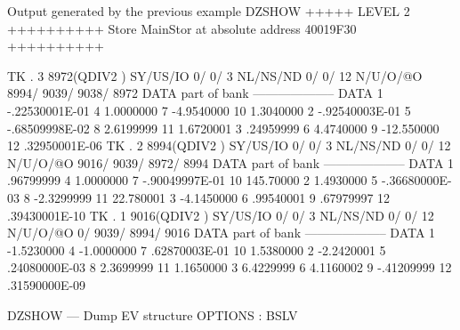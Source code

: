 \begin{Listing}{Output generated by the previous example}
DZSHOW  +++++ LEVEL     2 ++++++++++            Store  MainStor at absolute address 40019F30      ++++++++++                     
                                                                                                                                 
 TK  .     3     8972(QDIV2   ) SY/US/IO    0/    0/   3 NL/NS/ND    0/    0/      12 N/U/O/@O    8994/    9039/    9038/    8972
DATA part of bank                                         --------------------                                                   
DATA      1    -.22530001E-01     4     1.0000000         7    -4.9540000        10     1.3040000                                
          2    -.92540003E-01     5    -.68509998E-02     8     2.6199999        11     1.6720001                                
          3     .24959999         6     4.4740000         9    -12.550000        12     .32950001E-06                            
 TK  .     2     8994(QDIV2   ) SY/US/IO    0/    0/   3 NL/NS/ND    0/    0/      12 N/U/O/@O    9016/    9039/    8972/    8994
DATA part of bank                                         --------------------                                                   
DATA      1     .96799999         4     1.0000000         7    -.90049997E-01    10     145.70000                                
          2     1.4930000         5    -.36680000E-03     8    -2.3299999        11     22.780001                                
          3    -4.1450000         6     .99540001         9     .67979997        12     .39430001E-10                            
 TK  .     1     9016(QDIV2   ) SY/US/IO    0/    0/   3 NL/NS/ND    0/    0/      12 N/U/O/@O       0/    9039/    8994/    9016
DATA part of bank                                         --------------------                                                   
DATA      1    -1.5230000         4    -1.0000000         7     .62870003E-01    10     1.5380000                                
          2    -2.2420001         5     .24080000E-03     8     2.3699999        11     1.1650000                                
          3     6.4229999         6     4.1160002         9    -.41209999        12     .31590000E-09                            
                                                                                                                                 
DZSHOW --- Dump EV structure                                                                       OPTIONS : BSLV                
                                                                                                                                 

\end{Listing}
